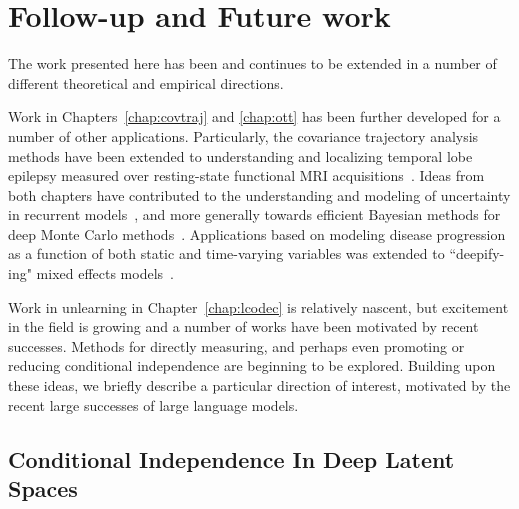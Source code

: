 \chapter{Follow-up and Future work}

The work presented here has been and continues 
to be extended in a number of different theoretical 
and empirical directions.

Work in Chapters~\ref{chap:covtraj} and \ref{chap:ott} has been further developed for a number of other applications.
Particularly, the covariance trajectory analysis
methods have been extended 
to understanding and localizing temporal lobe epilepsy
measured over resting-state functional MRI acquisitions~\citep{ohbm,ecpcovtraj}.
Ideas from both chapters have contributed
to the understanding and modeling of uncertainty
in recurrent models~\citep{spgru},
and more generally towards efficient
Bayesian methods for deep Monte Carlo methods~\citep{mcreparam}.
Applications based on modeling disease progression
as a function of both static and time-varying 
variables was extended to ``deepify-ing" mixed effects models~\citep{deepmem}.

Work in unlearning in Chapter~\ref{chap:lcodec} is relatively nascent,
but excitement in the field is growing
and a number of works have been motivated
by recent successes.
Methods for directly measuring, and perhaps
even promoting or reducing conditional
independence are beginning to be explored.
Building upon these ideas,
we briefly describe a particular 
direction of interest, motivated
by the recent large successes of large language models.

\section{Conditional Independence In Deep Latent Spaces}\label{sec:latents}


